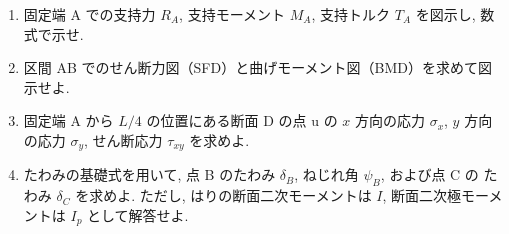 \begin{enumerate}[label=(\arabic*)]
  \item 固定端 A での支持力 $R_A$, 支持モーメント $M_A$, 支持トルク $T_A$ を図示し, 数式で示せ.

  \item 区間 AB でのせん断力図（SFD）と曲げモーメント図（BMD）を求めて図示せよ.

  \item 固定端 A から $L/4$ の位置にある断面 D の点 u の $x$ 方向の応力 $\sigma_x$,
        $y$ 方向の応力 $\sigma_y$, せん断応力 $\tau_{xy}$ を求めよ.

  \item たわみの基礎式を用いて, 点 B のたわみ $\delta_B$, ねじれ角 $\psi_B$, および点 C の
        たわみ $\delta_C$ を求めよ. ただし, はりの断面二次モーメントは $I$,
        断面二次極モーメントは $I_p$ として解答せよ.
\end{enumerate}
